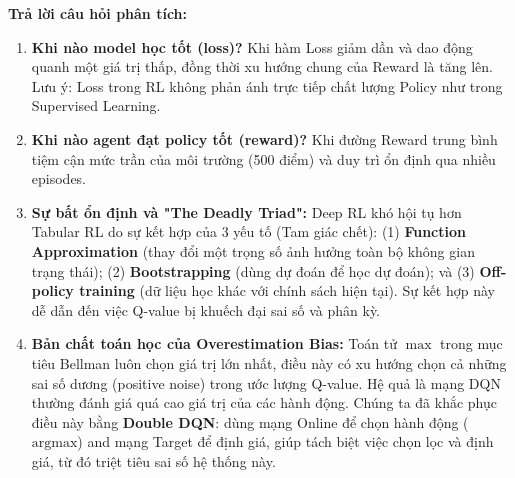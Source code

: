 \textbf{Trả lời câu hỏi phân tích:}
\begin{enumerate}
    \item \textbf{Khi nào model học tốt (loss)?} Khi hàm Loss giảm dần và dao động quanh một giá trị thấp, đồng thời xu hướng chung của Reward là tăng lên. Lưu ý: Loss trong RL không phản ánh trực tiếp chất lượng Policy như trong Supervised Learning.
    \item \textbf{Khi nào agent đạt policy tốt (reward)?} Khi đường Reward trung bình tiệm cận mức trần của môi trường (500 điểm) và duy trì ổn định qua nhiều episodes.
    \item \textbf{Sự bất ổn định và "The Deadly Triad":} Deep RL khó hội tụ hơn Tabular RL do sự kết hợp của 3 yếu tố (Tam giác chết): (1) \textbf{Function Approximation} (thay đổi một trọng số ảnh hưởng toàn bộ không gian trạng thái); (2) \textbf{Bootstrapping} (dùng dự đoán để học dự đoán); và (3) \textbf{Off-policy training} (dữ liệu học khác với chính sách hiện tại). Sự kết hợp này dễ dẫn đến việc Q-value bị khuếch đại sai số và phân kỳ.
    \item \textbf{Bản chất toán học của Overestimation Bias:} Toán tử $\max$ trong mục tiêu Bellman luôn chọn giá trị lớn nhất, điều này có xu hướng chọn cả những sai số dương (positive noise) trong ước lượng Q-value. Hệ quả là mạng DQN thường đánh giá quá cao giá trị của các hành động. Chúng ta đã khắc phục điều này bằng \textbf{Double DQN}: dùng mạng Online để chọn hành động ($\text{argmax}$) and mạng Target để định giá, giúp tách biệt việc chọn lọc và định giá, từ đó triệt tiêu sai số hệ thống này.
\end{enumerate}
